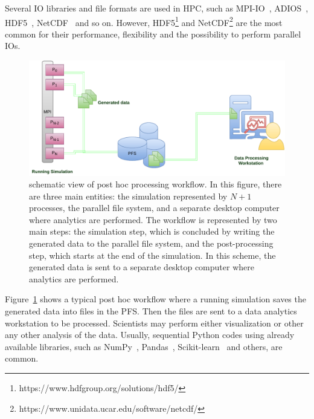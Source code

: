 Several IO libraries and file formats are used in HPC, such as MPI-IO~\cite{mpiio}, ADIOS~\cite{lofstead_insights_2013_adios, godoy_adios2_2020}, HDF5~\cite{Folk1999HDF5}, NetCDF~\cite{1592942_netcdf} and so on. However,  HDF5\footnote{https://www.hdfgroup.org/solutions/hdf5/} and NetCDF\footnote{https://www.unidata.ucar.edu/software/netcdf/} are the most common for their performance, flexibility and the possibility to perform parallel IOs. 


\begin{figure}[h!]\centering
\includegraphics[scale=0.8]{figures/posthoc.pdf}
\caption{schematic view of post hoc processing workflow. In this figure, there are three main entities: the simulation represented by $N+1$ processes, the parallel file system, and a separate desktop computer where analytics are performed.  
The workflow is represented by two main steps: the simulation step, which is concluded by writing the generated data to the parallel file system, and the post-processing step, which starts at the end of the simulation. In this scheme, the generated data is sent to a separate desktop computer where analytics are performed.}
\label{figposthoc}
\end{figure}
  
Figure~\ref{figposthoc} shows a typical post hoc workflow where a running simulation saves the generated data into files in the PFS. Then the files are sent to a data analytics workstation to be processed. 
Scientists may perform either visualization or other any other analysis of the data. Usually, sequential Python codes using already available libraries, such as NumPy~\cite{van2011numpy}, Pandas~\cite{mckinney2010data}, Scikit-learn~\cite{pedregosa2011scikit, kramer2016scikit} and others, are common. 

